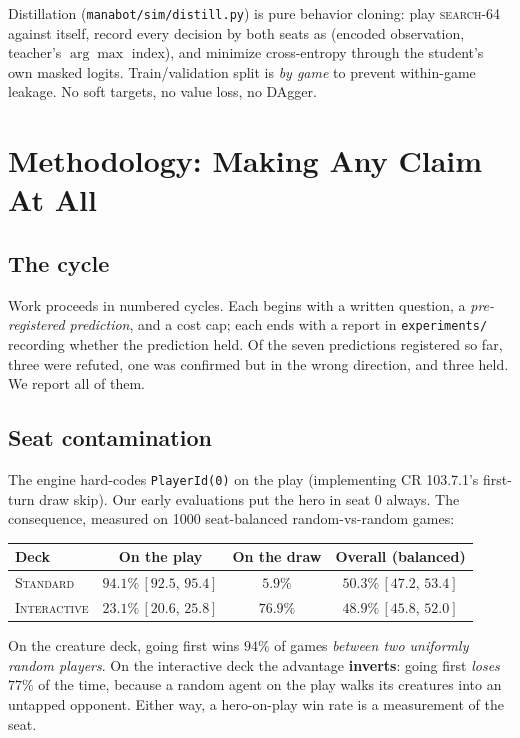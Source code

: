 \documentclass[11pt]{article}
\newcommand{\stddeck}{\textsc{Standard}}
\newcommand{\intdeck}{\textsc{Interactive}}
\newcommand{\searchn}[1]{\textsc{search}-#1}
\newcommand{\ci}[2]{\,[#1,\,#2]}
\begin{document}
Distillation (\texttt{manabot/sim/distill.py}) is pure behavior cloning: play \searchn{64} against itself, record every decision by both seats as (encoded observation, teacher's $\arg\max$ index), and minimize cross-entropy through the student's own masked logits. Train/validation split is \emph{by game} to prevent within-game leakage. No soft targets, no value loss, no DAgger.

\section{Methodology: Making Any Claim At All}
\label{sec:method}

\subsection{The cycle}

Work proceeds in numbered cycles. Each begins with a written question, a \emph{pre-registered prediction}, and a cost cap; each ends with a report in \texttt{experiments/} recording whether the prediction held. Of the seven predictions registered so far, three were refuted, one was confirmed but in the wrong direction, and three held. We report all of them.

\subsection{Seat contamination}
\label{sec:seat}

The engine hard-codes \texttt{PlayerId(0)} on the play (implementing CR 103.7.1's first-turn draw skip). Our early evaluations put the hero in seat 0 always. The consequence, measured on 1000 seat-balanced random-vs-random games:

\begin{center}\small
\begin{tabular}{lccc}
\toprule
Deck & On the play & On the draw & Overall (balanced) \\
\midrule
\stddeck  & $94.1\%\ci{92.5}{95.4}$ & $5.9\%$ & $50.3\%\ci{47.2}{53.4}$ \\
\intdeck  & $23.1\%\ci{20.6}{25.8}$ & $76.9\%$ & $48.9\%\ci{45.8}{52.0}$ \\
\bottomrule
\end{tabular}
\end{center}

On the creature deck, going first wins $94\%$ of games \emph{between two uniformly random players}. On the interactive deck the advantage \textbf{inverts}: going first \emph{loses} $77\%$ of the time, because a random agent on the play walks its creatures into an untapped opponent. Either way, a hero-on-play win rate is a measurement of the seat.
\end{document}
